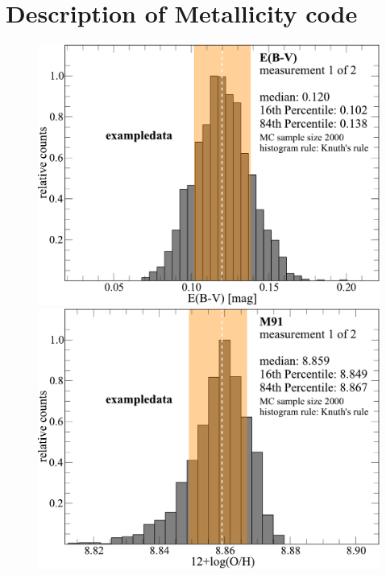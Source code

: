 \documentclass{emulateapj}
\begin{document}
\section{Description of Metallicity code}\label{method_sec}


\begin{figure}[!ht]
\centerline{
\includegraphics[width=0.98\columnwidth]{exampledata_n2000_EB-V_1.pdf}
\includegraphics[width=0.98\columnwidth]{exampledata_n2000_M91_1.pdf}}
\centerline{
}
\end{figure}
\end{document}

